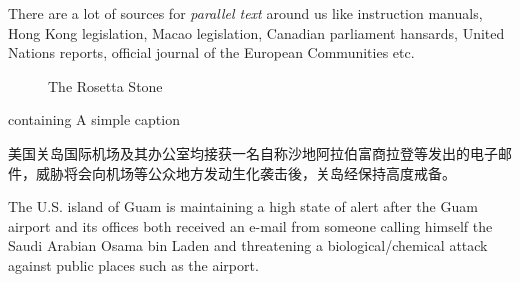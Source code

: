 \documentclass[a4paper,10pt]{report}
\begin{document}
There are a lot of sources for \emph{parallel text} around us like instruction manuals, Hong Kong legislation, Macao legislation, Canadian parliament hansards, United Nations reports, official journal of the European Communities etc.

\begin{figure}[ht!]
\centering
{}
\caption{The Rosetta Stone \label{overflow}}
\label{mt:rosetta}
\end{figure}


 containing  A simple caption

\begin{CJK*}{UTF8}{gbsn}
美国关岛国际机场及其办公室均接获一名自称沙地阿拉伯富商拉登等发出的电子邮件，威胁将会向机场等公众地方发动生化袭击後，关岛经保持高度戒备。
\end{CJK*}

The U.S. island of Guam is maintaining a high state of alert after the Guam airport and its offices both received an e-mail from someone calling himself the Saudi Arabian Osama bin Laden and threatening a biological/chemical attack against public places such as the airport. 
\end{document}
